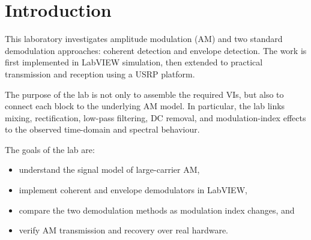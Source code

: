 \section{Introduction}

This laboratory investigates amplitude modulation (AM) and two standard
demodulation approaches: coherent detection and envelope detection. The work is
first implemented in LabVIEW simulation, then extended to practical
transmission and reception using a USRP platform.

The purpose of the lab is not only to assemble the required VIs, but also to
connect each block to the underlying AM model. In particular, the lab links
mixing, rectification, low-pass filtering, DC removal, and modulation-index
effects to the observed time-domain and spectral behaviour.

The goals of the lab are:
\begin{itemize}
\item understand the signal model of large-carrier AM,
\item implement coherent and envelope demodulators in LabVIEW,
\item compare the two demodulation methods as modulation index changes, and
\item verify AM transmission and recovery over real hardware.
\end{itemize}
